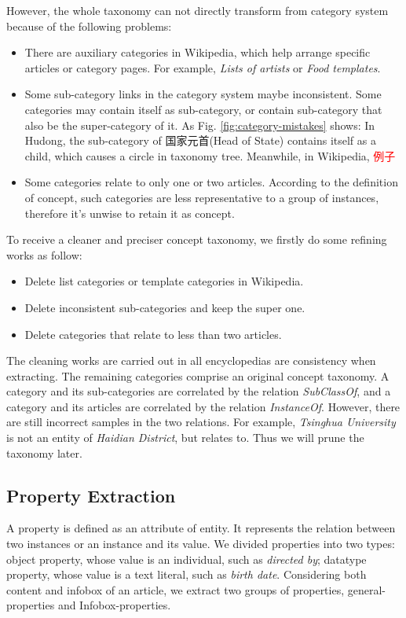\documentclass[runningheads,a4paper]{llncs}
\begin{document}
However, the whole taxonomy can not directly transform from category system because of the following problems:
\begin{itemize}
    \item There are auxiliary categories in Wikipedia, which help arrange specific articles or category pages. For example, \emph{Lists of artists} or \emph{Food templates}.
    \item Some sub-category links in the category system maybe inconsistent. Some categories may contain itself as sub-category, or contain sub-category that also be the super-category of it. As Fig. \ref{fig:category-mistakes} shows: In Hudong, the sub-category of 国家元首(Head of State) contains itself as a child, which causes a circle in taxonomy tree. Meanwhile, in Wikipedia, \textcolor{red}{例子}
    \item Some categories relate to only one or two articles. According to the definition of concept, such categories are less representative to a group of instances, therefore it's unwise to retain it as concept.
\end{itemize}
   To receive a cleaner and preciser concept taxonomy, we firstly do some refining works as follow:
\begin{itemize}
    \item Delete list categories or template categories in Wikipedia.
    \item Delete inconsistent sub-categories and keep the super one.
    \item Delete categories that relate to less than two articles.
\end{itemize}
The cleaning works are carried out in all encyclopedias are consistency when extracting. The remaining categories comprise an original concept taxonomy. A category and its sub-categories are correlated by the relation \emph{SubClassOf}, and a category and its articles are correlated by the relation \emph{InstanceOf}. However, there are still incorrect samples in the two relations. For example, \emph{Tsinghua University} is not an entity of \emph{Haidian District}, but relates to. Thus we will prune the taxonomy later.

\subsection{Property Extraction}
\label{sec:pe}
A property is defined as an attribute of entity. It represents the relation between two instances or an instance and its value. We divided properties into two types: object property, whose value is an individual, such as \emph{directed by}; datatype property, whose value is a text literal, such as \emph{birth date}. Considering both content and infobox of an article, we extract two groups of properties, general-properties and Infobox-properties.
\end{document}
